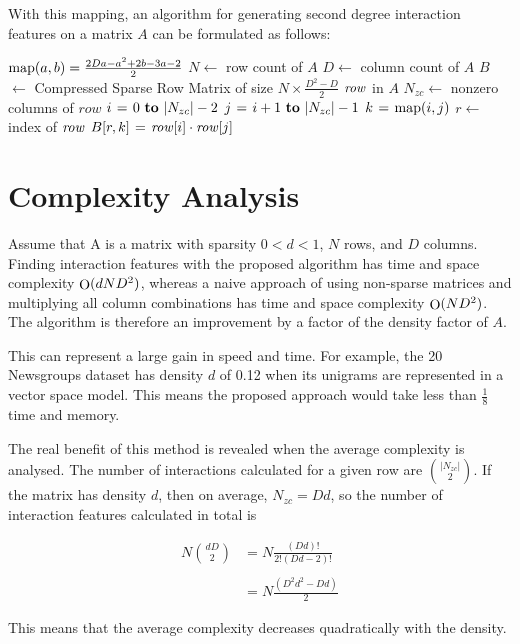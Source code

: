 \documentclass[11pt]{article}
\begin{document}
With this mapping, an algorithm for generating second degree interaction features on a 
matrix $A$ can be formulated as follows:

\begin{codebox}
    \zi $\func{map}(a, b) = \frac{2Da-a^2+2b-3a-2}{2}$
    \zi $N \gets$ row count of $A$
    \zi $D \gets$ column count of $A$
    \zi $B$ $\gets$ Compressed Sparse Row Matrix of size $N \times \frac{D^2-D}{2}$
    \zi \For $\id{row}$ in $A$ \Do
    \zi     $N_{zc} \gets$ nonzero columns of $row$
    \zi     \For $i \gets 0 \To |N_{zc}|-2$ \Do
    \zi         \For $j \gets i+1 \To |N_{zc}|-1$ \Do
    \zi             $k \gets \func{map}(i, j)$
    \zi             $r \gets$ index of $\id{row}$
    \zi             $B[r, k] \gets \id{row}[i] \cdot \id{row}[j]$
                \End
            \End
       	\End
\end{codebox}

\section{Complexity Analysis}
Assume that A is a matrix with sparsity $0 < d < 1$, $N$ rows, and $D$ columns. Finding 
interaction features with the proposed algorithm has time and space complexity 
$\func{O}(d N D^2)$, 
whereas a naive approach of using non-sparse matrices and multiplying all column 
combinations has time and space complexity $\func{O}(N D^2)$. The algorithm is therefore an 
improvement by a factor of the density factor of $A$.

This can represent a large gain in speed and time. For example, the 20 Newsgroups dataset 
has density $d$ of 0.12 when its unigrams are represented in a vector space model. This 
means the proposed approach would take less than $\frac{1}{8}$ time and memory.

The real benefit of this method is revealed when the average complexity is analysed. The 
number of interactions calculated for a given row are $\binom{|N_{zc}|}{2}$. If the matrix has 
density $d$, then on average, $N_{zc} = D d$, so the number of interaction features 
calculated in total is 

\begin{align*}
N \binom{d D}{2} &= N \frac{(Dd)!}{2!(Dd-2)!}\\
    \\
    &= N \frac{(D^2d^2-Dd)}{2}
\end{align*}

This means that the average complexity decreases quadratically with the density.
\end{document}

